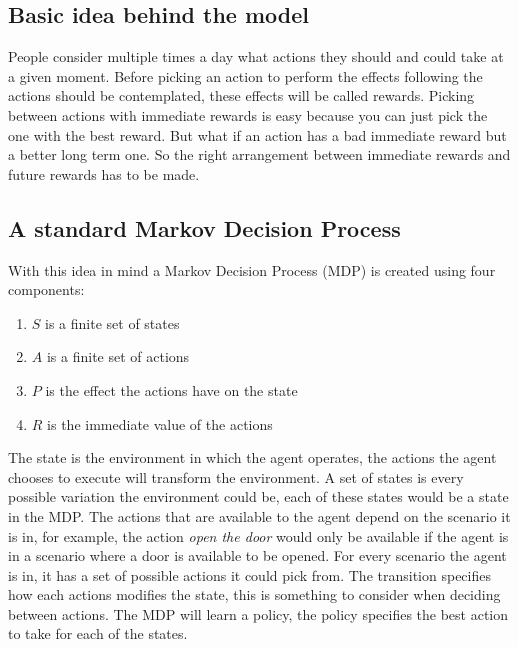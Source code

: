 \label{chapter:mdp}

\subsection{Basic idea behind the model}
People consider multiple times a day what actions they should and could take at a given moment. Before picking an action to perform the effects following the actions should be contemplated, these effects will be called rewards. Picking between actions with immediate rewards is easy because you can just pick the one with the best reward. But what if an action has a bad immediate reward but a better long term one. So the right arrangement between immediate rewards and future rewards has to be made.
\subsection{A standard Markov Decision Process}
With this idea in mind a Markov Decision Process (MDP) is created using four components:
\begin{enumerate}[nolistsep]
\item ${\displaystyle S}$ is a finite set of states
\item ${\displaystyle A}$ is a finite set of actions
\item ${\displaystyle P}$ is the effect the actions have on the state
\item ${\displaystyle R}$ is the immediate value of the actions
\end{enumerate}
\par
The state is the environment in which the agent operates, the actions the agent chooses to execute will transform the environment. A set of states is every possible variation the environment could be, each of these states would be a state in the MDP. The actions that are available to the agent depend on the scenario it is in, for example, the action \textit{open the door} would only be available if the agent is in a scenario where a door is available to be opened. For every scenario the agent is in, it has a set of possible actions it could pick from. The transition specifies how each actions modifies the state, this is something to consider when deciding between actions. The MDP will learn a policy, the policy specifies the best action to take for each of the states.
